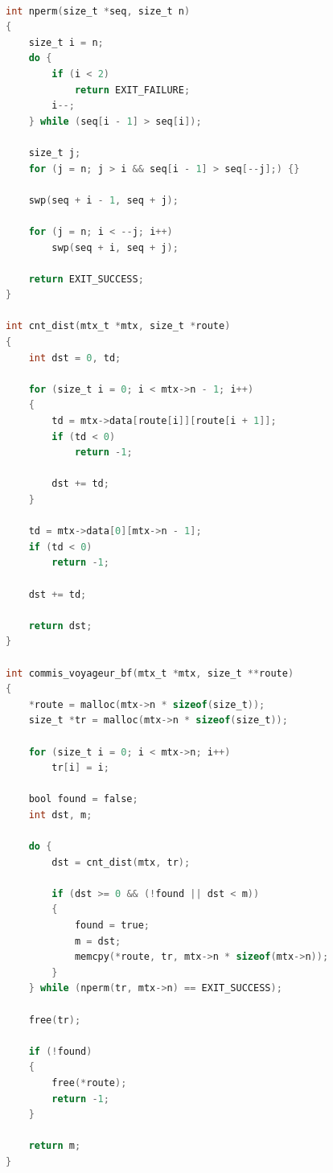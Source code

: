 \documentclass[12pt]{report}
\begin{document}
\begin{lstlisting}[language=C,caption={Алгоритм полного перебора},label=code]

int nperm(size_t *seq, size_t n)
{
	size_t i = n;
	do {
		if (i < 2)
			return EXIT_FAILURE; 
		i--;
	} while (seq[i - 1] > seq[i]);
	
	size_t j;
	for (j = n; j > i && seq[i - 1] > seq[--j];) {}
		
	swp(seq + i - 1, seq + j);
	
	for (j = n; i < --j; i++)
		swp(seq + i, seq + j);
	
	return EXIT_SUCCESS;
}

int cnt_dist(mtx_t *mtx, size_t *route)
{
	int dst = 0, td;
	
	for (size_t i = 0; i < mtx->n - 1; i++)
	{
		td = mtx->data[route[i]][route[i + 1]];
		if (td < 0)
			return -1;
		
		dst += td;
	}
	
	td = mtx->data[0][mtx->n - 1];
	if (td < 0)
		return -1;
	
	dst += td;
	
	return dst;
}

int commis_voyageur_bf(mtx_t *mtx, size_t **route)
{
	*route = malloc(mtx->n * sizeof(size_t));
	size_t *tr = malloc(mtx->n * sizeof(size_t));
	
	for (size_t i = 0; i < mtx->n; i++)
		tr[i] = i;
	
	bool found = false;
	int dst, m;
	
	do {
		dst = cnt_dist(mtx, tr);
		
		if (dst >= 0 && (!found || dst < m))
		{
			found = true;
			m = dst;
			memcpy(*route, tr, mtx->n * sizeof(mtx->n));
		}
	} while (nperm(tr, mtx->n) == EXIT_SUCCESS);
	
	free(tr);
	
	if (!found)
	{
		free(*route);
		return -1;
	}
	
	return m;
}

\end{lstlisting}
	
\end{document}
